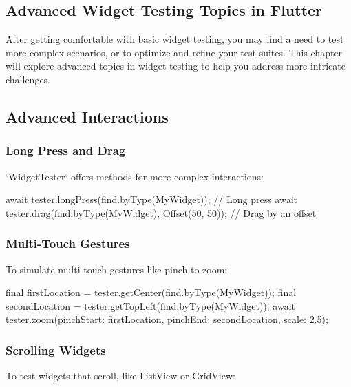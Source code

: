 \subsection{Advanced Widget Testing Topics in Flutter}

After getting comfortable with basic widget testing, you may find a need to test more complex scenarios, or to optimize and refine your test suites. 
This chapter will explore advanced topics in widget testing to help you address more intricate challenges.

\subsection*{Advanced Interactions}

\subsubsection*{Long Press and Drag}

`WidgetTester` offers methods for more complex interactions:

\begin{dartcode}
await tester.longPress(find.byType(MyWidget)); // Long press
await tester.drag(find.byType(MyWidget), Offset(50, 50)); // Drag by an offset
\end{dartcode}

\subsubsection*{Multi-Touch Gestures}
To simulate multi-touch gestures like pinch-to-zoom:

\begin{dartcode}
final firstLocation = tester.getCenter(find.byType(MyWidget));
final secondLocation = tester.getTopLeft(find.byType(MyWidget));
await tester.zoom(pinchStart: firstLocation, pinchEnd: secondLocation, scale: 2.5);
\end{dartcode}

\subsubsection*{Scrolling Widgets}

To test widgets that scroll, like ListView or GridView:


